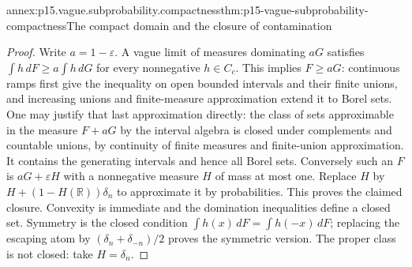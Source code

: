 \begin{annexitem}{annex:p15.vague.subprobability.compactness}{thm:p15-vague-subprobability-compactness}{The compact domain and the closure of contamination}
\begin{proof}
Write \(a=1-\varepsilon\). A vague limit of measures dominating \(aG\)
satisfies \(\int h\,dF\geq a\int h\,dG\) for every nonnegative \(h\in C_c\).
This implies \(F\geq aG\): continuous ramps first give the inequality
on open bounded intervals and their finite unions, and increasing
unions and finite-measure approximation extend it to Borel sets.
One may justify that last approximation directly: the class of sets
approximable in the measure \(F+aG\) by the interval algebra is closed
under complements and countable unions, by continuity of finite
measures and finite-union approximation. It contains the generating
intervals and hence all Borel sets.
Conversely such an \(F\) is \(aG+\varepsilon H\) with a nonnegative
measure \(H\) of mass at most one. Replace \(H\) by
\(H+(1-H(\mathbb R))\delta_n\) to approximate it by probabilities.
This proves the claimed closure. Convexity is immediate and the
domination inequalities define a closed set. Symmetry is the closed
condition \(\int h(x)\,dF=\int h(-x)\,dF\); replacing the escaping atom
by \((\delta_n+\delta_{-n})/2\) proves the symmetric version.
The proper class is not closed: take \(H=\delta_n\).
\end{proof}
\end{annexitem}

